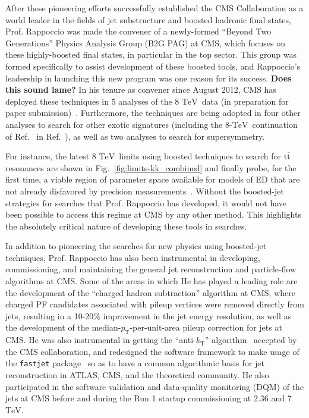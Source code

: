 \documentclass[12pt]{proposalnsf}
\newcommand{\TeV}{\ensuremath{\mathrm{TeV}}}
\newcommand{\ttbar}        {\ensuremath{\mathrm{t}\overline{\mathrm{t}}}}
\begin{document}
After these pioneering efforts successfully established the CMS
Collaboration as a world leader in the fields of jet substructure and
boosted hadronic final states, Prof. Rappoccio
was made the convener of a newly-formed ``Beyond Two Generations'' Physics
Analysis Group (B2G PAG) at CMS, which focuses on these highly-boosted
final states, in particular in the top sector. This group was formed
specifically to assist development of these boosted tools, and
Rappoccio's leadership in launching this new program was one reason
for its success. {\bf Does this sound lame?}
In his tenure as convener since August 2012, CMS has deployed these
techniques in 5 analyses of the 8 \TeV\ data (in preparation for paper 
submission)~\cite{B2G-12-005,B2G-12-006,B2G-12-012,B2G-12-015,B2G-12-019}. 
Furthermore, the techniques are being adopted in four other
analyses to search for other exotic signatures (including the 8-\TeV\
continuation of Ref.~\cite{EXO-11-095} in Ref.~\cite{EXO-12-024}), as
well as two analyses to search for supersymmetry. 

For instance, the latest 8 \TeV\ limits using boosted
techniques to search for $\ttbar$ resonances are shown in
Fig.~\ref{fig:limits-kk_combined} and finally probe, for
the first time, a viable region of parameter space available for
models of ED that are not already disfavored by
precision measurements~\cite{Davoudiasl:2009cd}. 
Without the boosted-jet strategies for searches that Prof. Rappoccio has
developed, it would not have been possible to access this regime at
CMS by any other method. This highlights the absolutely critical
nature of developing these tools in searches. 



In addition to pioneering the searches for new physics using
boosted-jet techniques, Prof. Rappoccio has also been instrumental in developing,
commissioning, and maintaining the general jet reconstruction and
particle-flow algorithms at CMS. Some of the areas in which
He has played a leading role are the development of the ``charged
hadron subtraction'' algorithm at CMS, where charged PF candidates
associated with pileup vertices were removed directly from
jets, resulting in a 10-20\% improvement in the jet energy
resolution, as well as the development of the
median-$p_\mathrm{T}$-per-unit-area pileup correction for jets at CMS. He was also
instrumental in getting the ``anti-$k_\mathrm{T}$'' algorithm~\cite{ktalg} accepted
by the CMS collaboration, and redesigned the software framework to
make usage of the {\tt fastjet} package~\cite{fastjet,fastjet1} so as to have a
common algorithmic basis for jet reconstruction in ATLAS, CMS, and the
theoretical community. He also
participated in the software validation and
data-quality monitoring (DQM) of the jets at CMS before and during the
Run 1 startup commissioning at 2.36 and 7 \TeV. 
\end{document}

